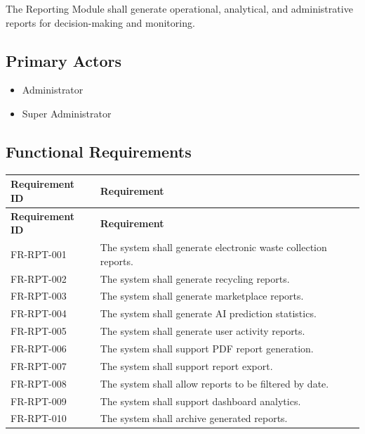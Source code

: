 The Reporting Module shall generate operational, analytical, and
administrative reports for decision-making and monitoring.

\subsection{Primary Actors}

\begin{itemize}
\item Administrator
\item Super Administrator
\end{itemize}

\subsection{Functional Requirements}

\begin{longtable}{|p{3cm}|p{10.2cm}|}

\hline
\textbf{Requirement ID} &
\textbf{Requirement} \\
\hline
\endfirsthead

\hline
\textbf{Requirement ID} &
\textbf{Requirement} \\
\hline
\endhead

FR-RPT-001 &
The system shall generate electronic waste collection reports.\\
\hline

FR-RPT-002 &
The system shall generate recycling reports.\\
\hline

FR-RPT-003 &
The system shall generate marketplace reports.\\
\hline

FR-RPT-004 &
The system shall generate AI prediction statistics.\\
\hline

FR-RPT-005 &
The system shall generate user activity reports.\\
\hline

FR-RPT-006 &
The system shall support PDF report generation.\\
\hline

FR-RPT-007 &
The system shall support report export.\\
\hline

FR-RPT-008 &
The system shall allow reports to be filtered by date.\\
\hline

FR-RPT-009 &
The system shall support dashboard analytics.\\
\hline

FR-RPT-010 &
The system shall archive generated reports.\\
\hline

\end{longtable}

